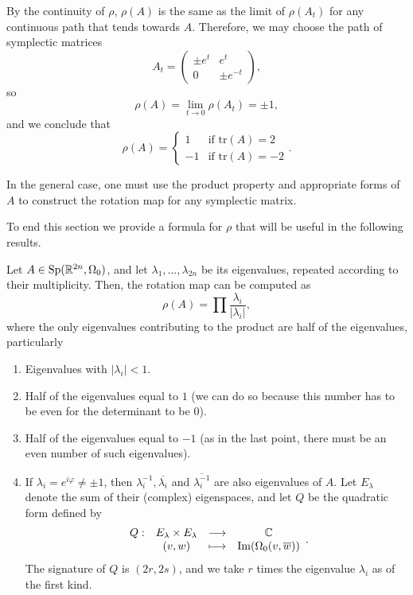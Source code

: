 \begin{enumerate}
	By the continuity of $\rho$, $\rho(A)$ is the same as the limit of $\rho(A_t)$ for any continuous path that tends towards $A$. Therefore, we may choose the path of symplectic matrices
	\[A_t = \begin{pmatrix} \pm e^t & e^t \\ 0 & \pm e^{-t} \end{pmatrix} ,\]
	so
	\[\rho(A) = \lim_{t \rightarrow 0} \rho(A_t) = \pm 1 ,\]
	and we conclude that
	\[\rho(A) = \left\{ \begin{array}{lc} 1 & \text{if tr}(A) = 2 \\ -1 & \text{if tr}(A) = -2 \end{array} \right. .\]
\end{enumerate}

In the general case, one must use the product property and appropriate forms of $A$ to construct the rotation map for any symplectic matrix.

To end this section we provide a formula for $\rho$ that will be useful in the following results.

\begin{lema} \label{rotationformula}
Let $A \in \mathrm{Sp}(\mathbb{R}^{2n},\Omega_0)$, and let $\lambda_1,...,\lambda_{2n}$ be its eigenvalues, repeated according to their multiplicity. Then, the rotation map can be computed as
\[\rho(A) = \prod \frac{\lambda_i}{|\lambda_i|} ,\]
where the only eigenvalues contributing to the product are half of the eigenvalues, particularly
\begin{enumerate}
	\item Eigenvalues with $|\lambda_i| < 1$.
	\item Half of the eigenvalues equal to $1$ (we can do so because this number has to be even for the determinant to be $0$).
	\item Half of the eigenvalues equal to $-1$ (as in the last point, there must be an even number of such eigenvalues).
	\item If $\lambda_i = e^{i \varphi} \neq \pm 1$, then $\lambda_i^{-1}, \overline{\lambda_i}$ and $\overline{\lambda_i^{-1}}$ are also eigenvalues of $A$. Let $E_{\lambda}$ denote the sum of their (complex) eigenspaces, and let $Q$ be the quadratic form defined by
	\[\begin{array}{rccc} Q : & E_{\lambda} \times E_{\lambda} & \longrightarrow & \mathbb{C} \\ & (v,w) & \longmapsto & \mathrm{Im}(\Omega_0(v,\overline{w})) \end{array} .\]
	The signature of $Q$ is $(2r,2s)$, and we take $r$ times the eigenvalue $\lambda_i$ as of the first kind.
\end{enumerate}

\end{lema}
